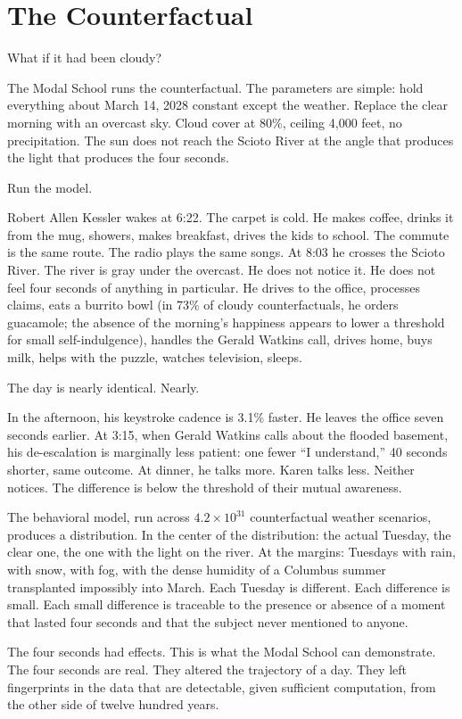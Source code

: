 \chapter{The Counterfactual}

What if it had been cloudy?

The Modal School runs the counterfactual. The parameters are simple: hold everything about March 14, 2028 constant except the weather. Replace the clear morning with an overcast sky. Cloud cover at 80\%, ceiling 4,000 feet, no precipitation. The sun does not reach the Scioto River at the angle that produces the light that produces the four seconds.

Run the model.

Robert Allen Kessler wakes at 6:22. The carpet is cold. He makes coffee, drinks it from the mug, showers, makes breakfast, drives the kids to school. The commute is the same route. The radio plays the same songs. At 8:03 he crosses the Scioto River. The river is gray under the overcast. He does not notice it. He does not feel four seconds of anything in particular. He drives to the office, processes claims, eats a burrito bowl (in 73\% of cloudy counterfactuals, he orders guacamole; the absence of the morning's happiness appears to lower a threshold for small self-indulgence), handles the Gerald Watkins call, drives home, buys milk, helps with the puzzle, watches television, sleeps.

The day is nearly identical. Nearly.

In the afternoon, his keystroke cadence is 3.1\% faster. He leaves the office seven seconds earlier. At 3:15, when Gerald Watkins calls about the flooded basement, his de-escalation is marginally less patient: one fewer ``I understand,'' 40 seconds shorter, same outcome. At dinner, he talks more. Karen talks less. Neither notices. The difference is below the threshold of their mutual awareness.

The behavioral model, run across $4.2 \times 10^{31}$ counterfactual weather scenarios, produces a distribution. In the center of the distribution: the actual Tuesday, the clear one, the one with the light on the river. At the margins: Tuesdays with rain, with snow, with fog, with the dense humidity of a Columbus summer transplanted impossibly into March. Each Tuesday is different. Each difference is small. Each small difference is traceable to the presence or absence of a moment that lasted four seconds and that the subject never mentioned to anyone.

The four seconds had effects. This is what the Modal School can demonstrate. The four seconds are real. They altered the trajectory of a day. They left fingerprints in the data that are detectable, given sufficient computation, from the other side of twelve hundred years.

